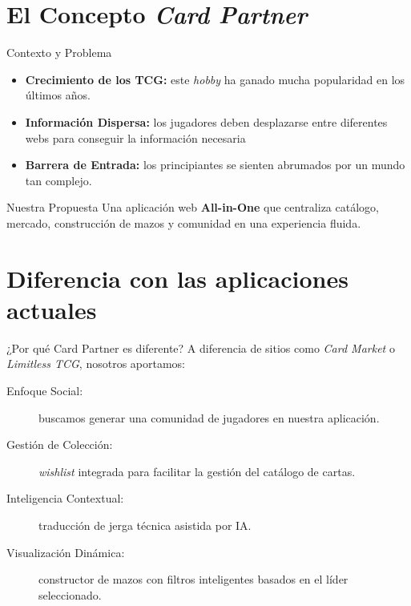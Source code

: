 \documentclass[10pt, aspectratio=169]{beamer}
\begin{document}
	\section{El Concepto \textit{Card Partner}}
	\begin{frame}{Contexto y Problema}
		
		\begin{itemize}
			\item \textbf{Crecimiento de los TCG:} este \textit{hobby} ha ganado mucha popularidad en los últimos años.
			\item \textbf{Información Dispersa:} los jugadores deben desplazarse entre diferentes webs para conseguir la información necesaria
			\item \textbf{Barrera de Entrada:} los principiantes se sienten abrumados por un mundo tan complejo.
		\end{itemize}
		\vspace{0.3cm}
		\begin{block}{Nuestra Propuesta}
			Una aplicación web \textbf{All-in-One} que centraliza catálogo, mercado, construcción de mazos y comunidad en una experiencia fluida.
		\end{block}
	\end{frame}
	
	\section{Diferencia con las aplicaciones actuales}
	\begin{frame}{¿Por qué Card Partner es diferente?}
		A diferencia de sitios como \textit{Card Market} o \textit{Limitless TCG}, nosotros aportamos:
		\vspace{0.3cm}
		\begin{description}
			\item[Enfoque Social:] buscamos generar una comunidad de jugadores en nuestra aplicación.
			\item[Gestión de Colección:] \textit{wishlist} integrada para facilitar la gestión del catálogo de cartas.
			\item[Inteligencia Contextual:] traducción de jerga técnica asistida por IA.
			\item[Visualización Dinámica:] constructor de mazos con filtros inteligentes basados en el líder seleccionado.
		\end{description}
	\end{frame}
	
\end{document}

